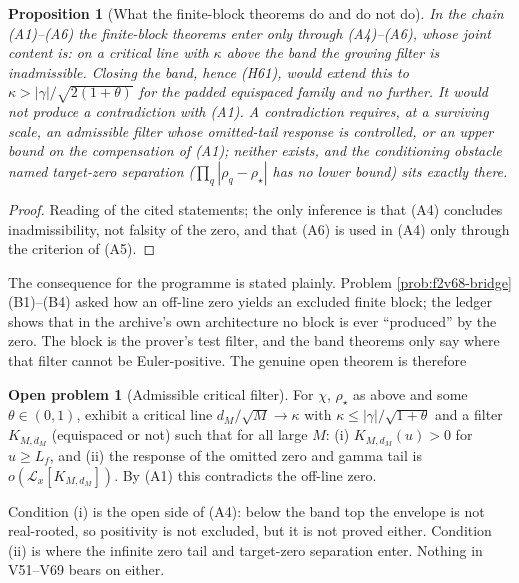 \documentclass[11pt]{article}
\newtheorem{proposition}[theorem]{Proposition}
\theoremstyle{definition}
\newtheorem{problem}[theorem]{Open problem}
\theoremstyle{remark}
\begin{document}
\begin{proposition}[What the finite-block theorems do and do not do]
\label{prop:f2v69-ledger}
In the chain \textup{(A1)}--\textup{(A6)} the finite-block theorems enter
only through \textup{(A4)}--\textup{(A6)}, whose joint content is: on a
critical line with \(\kappa\) above the band the growing filter is
\emph{inadmissible}.  Closing the band, hence (H61), would extend this to
\(\kappa>|\gamma|/\sqrt{2(1+\theta)}\) for the padded equispaced family
and no further.  It would not produce a contradiction with
\textup{(A1)}.  A contradiction requires, at a surviving scale, an
admissible filter whose omitted-tail response is controlled, or an upper
bound on the compensation of \textup{(A1)}; neither exists, and the
conditioning obstacle named target-zero separation
(\(\prod_q|\rho_q-\rho_\star|\) has no lower bound) sits exactly there.
\end{proposition}

\begin{proof}
Reading of the cited statements; the only inference is that
\textup{(A4)} concludes inadmissibility, not falsity of the zero, and
that \textup{(A6)} is used in \textup{(A4)} only through the criterion of
\textup{(A5)}.
\end{proof}

The consequence for the programme is stated plainly.  Problem
\ref{prob:f2v68-bridge}(B1)--(B4) asked how an off-line zero yields an
excluded finite block; the ledger shows that in the archive's own
architecture no block is ever ``produced'' by the zero.  The block is the
prover's test filter, and the band theorems only say where that filter
cannot be Euler-positive.  The genuine open theorem is therefore

\begin{problem}[Admissible critical filter]
\label{prob:f2v69-admissible}
For \(\chi\), \(\rho_\star\) as above and some \(\theta\in(0,1)\), exhibit a
critical line \(d_M/\sqrt M\to\kappa\) with \(\kappa\le|\gamma|/\sqrt{1+\theta}\)
and a filter \(K_{M,d_M}\) (equispaced or not) such that for all large
\(M\): \textup{(i)} \(K_{M,d_M}(u)>0\) for \(u\ge L_f\), and
\textup{(ii)} the response of the omitted zero and gamma tail is
\(o(\mathcal L_x[K_{M,d_M}])\).  By \textup{(A1)} this contradicts the
off-line zero.
\end{problem}

Condition (i) is the open side of \textup{(A4)}: below the band top the
envelope is not real-rooted, so positivity is not excluded, but it is not
proved either.  Condition (ii) is where the infinite zero tail and
target-zero separation enter.  Nothing in V51--V69 bears on either.
\end{document}
